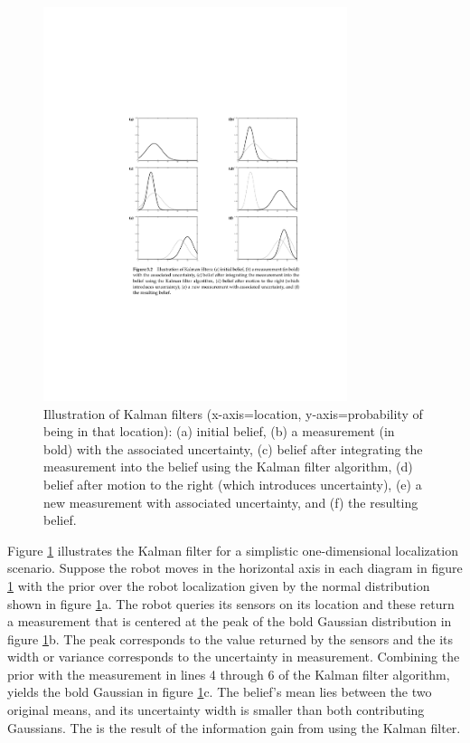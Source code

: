 \documentclass[conference]{IEEEtran}
\begin{document}
\begin{figure}[!t]
\centering
\includegraphics[width=3.5in]{./figures/KalmanIllustration.pdf}

\caption{Illustration of Kalman filters \cite{thrun} (x-axis=location, y-axis=probability of being in that location): (a) initial belief, (b) a measurement (in bold) with the associated uncertainty, (c) belief after integrating the measurement into the belief using the Kalman filter algorithm, (d) belief after motion to the right (which introduces uncertainty), (e) a new measurement with associated uncertainty, and (f) the resulting belief.}
\label{KalmanIllustration}
\end{figure}

Figure \ref{KalmanIllustration} illustrates the Kalman filter for a simplistic one-dimensional localization scenario. Suppose the robot moves in the horizontal axis in each diagram in figure \ref{KalmanIllustration} with the prior over the robot localization given by the normal distribution shown in figure \ref{KalmanIllustration}a. The robot queries its sensors on its location and these return a measurement that is centered at the peak of the bold Gaussian distribution in figure \ref{KalmanIllustration}b. The peak corresponds to the value returned by the sensors and the its width or variance corresponds to the uncertainty in measurement. Combining the prior with the measurement in lines 4 through 6 of the Kalman filter algorithm, yields the bold Gaussian in figure \ref{KalmanIllustration}c. The belief's mean lies between the two original means, and its uncertainty width is smaller than both contributing Gaussians. The is the result of the information gain from using the Kalman filter.\\
\end{document}
